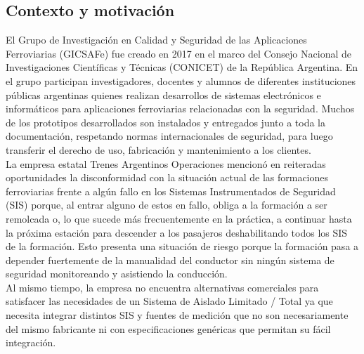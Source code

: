 
\subsection{Contexto y motivación}

El Grupo de Investigación en Calidad y Seguridad de las Aplicaciones Ferroviarias (GICSAFe) fue creado en 2017 en el marco del Consejo Nacional de Investigaciones Científicas y Técnicas (CONICET) de la República Argentina. En el grupo participan investigadores, docentes y alumnos de diferentes instituciones públicas argentinas quienes realizan desarrollos de sistemas electrónicos e informáticos para aplicaciones ferroviarias relacionadas con la seguridad. Muchos de los prototipos desarrollados son instalados y entregados junto a toda la documentación, respetando normas internacionales de seguridad, para luego transferir el derecho de uso, fabricación y mantenimiento a los clientes. \\



La empresa estatal Trenes Argentinos Operaciones mencionó en reiteradas oportunidades la disconformidad con la situación actual de las formaciones ferroviarias frente a algún fallo en los Sistemas Instrumentados de Seguridad (SIS) porque, al entrar alguno de estos en fallo, obliga a la formación a ser remolcada o, lo que sucede más frecuentemente en la práctica, a continuar hasta la próxima estación para descender a los pasajeros deshabilitando todos los SIS de la formación. Esto presenta una situación de riesgo porque la formación pasa a depender fuertemente de la manualidad del conductor sin ningún sistema de seguridad monitoreando y asistiendo la conducción. \\

Al mismo tiempo, la empresa no encuentra alternativas comerciales para satisfacer las necesidades de un Sistema de Aislado Limitado / Total ya que necesita integrar distintos SIS y fuentes de medición que no son necesariamente del mismo fabricante ni con especificaciones genéricas que permitan su fácil integración.  \\

